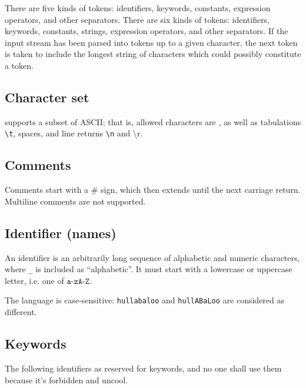 There are five kinds of tokens: identifiers, keywords, constants, expression operators, and other separators. There are six kinds of tokens: identifiers, keywords, constants, strings, expression operators, and other separators. If the input stream has been parsed into tokens up to a given character, the next token is taken to include the longest string of characters which could possibly constitute a token.

\subsection{Character set}
\QL supports a subset of ASCII; that is, allowed characters are
, as well as tabulations \texttt{\textbackslash{}t}, spaces, and line returns \texttt{\textbackslash{}n} and {\textbackslash{}r}.
\subsection{Comments}
Comments start with a \# sign, which then extends until the next carriage return. Multiline comments are not supported.

\subsection{Identifier (names)}
An identifier is an arbitrarily long sequence of alphabetic and numeric characters, where \texttt{\_} is included as ``alphabetic''. It must start with a lowercase or uppercase letter, i.e. one of $\texttt{a-zA-Z}$.

\noindent The language is case-sensitive: \texttt{hullabaloo} and \texttt{hullABaLoo} are considered as different.

\subsection{Keywords}
The following identifiers as reserved for keywords, and no one shall use them because it's forbidden and uncool.
\begin{multicols}{2}

\end{multicols}

